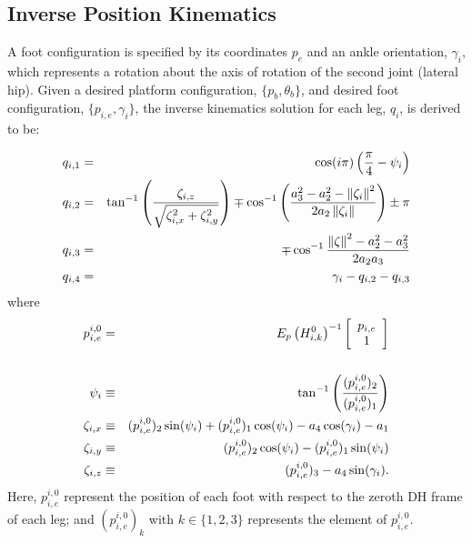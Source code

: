 		\subsection{Inverse Position Kinematics}
			\label{sec::inverse_position_kinematics}
			
			A foot configuration is specified by its coordinates ${p}_{e}$ and an ankle orientation, $\gamma_{i}$,  which represents a rotation about the axis of rotation of the second joint (lateral hip). Given a desired platform configuration, $\{ {p}_{b}, \theta_{b} \}$,  and desired \Ith foot configuration,  $\{ {p}_{i,e} , \gamma_{i} \}$, the inverse kinematics solution for each \Ith leg, ${q}_{i}$, is derived to be:

				\begin{eqnarray}
					q_{i,1} &=& \cos(i\pi) \left( \frac{\pi}{4} - \psi_{i} \right) \nonumber\\
					q_{i,2} &=&	\tan^{-1} \left(\frac{\zeta_{i,z}}{\sqrt{\zeta_{i,x}^2+\zeta_{i,y}^2}}\right) \mp \cos^{-1}\left(\frac{a_{3}^2-a_{2}^2-\left\lVert\zeta_{i}\right\rVert^2}{2 a_{2} \left\lVert\zeta_{i}\right\rVert }\right) \pm \pi 	\nonumber\\
					q_{i,3} &=&	\mp \cos^{-1}\frac{\left\lVert\zeta\right\rVert^2-a_{2}^2-a_{3}^2}{2 a_{2} a_{3}} \nonumber\\
					q_{i,4} &=&	\gamma_{i} - q_{i,2} - q_{i,3}	
				\end{eqnarray}
				where
				\begin{eqnarray}
					{p}_{i,e}^{i,0} &=&
					E_{p} 
					\left( {H}_{i,k}^{0} \right) ^{-1}
					\left[
						\begin{array}{c}
							{p}_{i,e} 		\\
							1 				\\ 	
						\end{array}
					\right]	\nonumber\\																						\nonumber\\
					\psi_{i} 	&\equiv&	\tan^{-1}\left( \frac{({p}_{i,e}^{i,0})_{2}}{({p}_{i,e}^{i,0})_{1} } \right)												\nonumber\\
					\zeta_{i,x} &\equiv& 	({p}_{i,e}^{i,0})_{2} \sin(\psi_{i}) + ({p}_{i,e}^{i,0})_{1} \cos(\psi_{i}) - a_{4} \cos(\gamma_{i}) - a_{1} 						\nonumber\\
					\zeta_{i,y} &\equiv& 	({p}_{i,e}^{i,0})_{2} \cos(\psi_{i}) - ({p}_{i,e}^{i,0})_{1} \sin(\psi_{i}) 											\nonumber\\
					\zeta_{i,z}	&\equiv&  	({p}_{i,e}^{i,0})_{3} - a_{4} \sin(\gamma_{i}) .
				\end{eqnarray}
			Here, ${p}_{i,e}^{i,0}$ represent the position of each \Ith foot with respect to the zeroth DH frame of each \Ith leg; and $({p}_{i,e}^{i,0})_{k}$ with $k\in\{1,2,3\}$ represents the \Kth element of ${p}_{i,e}^{i,0}$.

